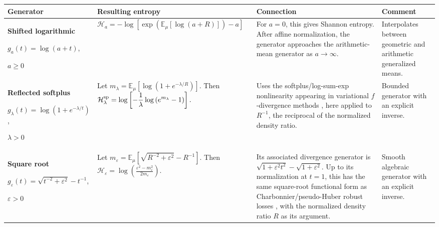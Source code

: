 \documentclass[reqno]{amsart}
\begin{document}
\begin{table}[t]
\centering
\small
\setlength{\tabcolsep}{4pt}
\renewcommand{\arraystretch}{1.35}
\begin{tabularx}{\textwidth}{
@{}
>{\raggedright\arraybackslash}p{}
>{\raggedright\arraybackslash}p{}
>{\raggedright\arraybackslash}X
>{\raggedright\arraybackslash}p{}
@{}
}
\toprule
Generator
&
Resulting entropy
&
Connection
&
Comment
\\
\midrule

\textbf{Shifted logarithmic}
\par
$g_a(t)=\log(a+t)$,
\par
$a\geq 0$
&
$\displaystyle
\mathcal H_a
=
-\log\left[
\exp\left(
\mathbb E_\mu[\log(a+R)]
\right)-a
\right]$
&
For $a=0$, this gives Shannon entropy. After affine normalization,
the generator approaches the arithmetic-mean generator as
$a\to\infty$.
&
Interpolates between geometric and arithmetic generalized means.
\\[3pt]

\textbf{Reflected softplus}
\par
$\displaystyle
g_\lambda(t)
=
\log\left(1+e^{-\lambda/t}\right)$,
\par
$\lambda>0$
&
Let
$\displaystyle
m_\lambda
=
\mathbb E_\mu
\left[
\log\left(1+e^{-\lambda/R}\right)
\right].
$
Then
$\displaystyle
\mathcal H^{\rm sp}_\lambda
=
\log\left[
-\frac{1}{\lambda}
\log\left(e^{m_\lambda}-1\right)
\right].
$
&
Uses the softplus/log-sum-exp nonlinearity appearing in variational $f$-divergence methods \cite{NowCseTom16}, here applied to $R^{-1}$, the reciprocal of the normalized density ratio.
&
Bounded generator with an explicit inverse.
\\[3pt]

\textbf{Square root}
\par
$\displaystyle
g_\varepsilon(t)
=
\sqrt{t^{-2}+\varepsilon^2}-t^{-1}$,
\par
$\varepsilon>0$
&
Let
$\displaystyle
m_\varepsilon
=
\mathbb E_\mu
\left[
\sqrt{R^{-2}+\varepsilon^2}-R^{-1}
\right].
$
Then
$\displaystyle
\mathcal H_\varepsilon
=
\log\left(
\frac{\varepsilon^2-m_\varepsilon^2}
{2m_\varepsilon}
\right).
$
&
Its associated divergence generator is $\sqrt{1+\varepsilon^2t^2}-\sqrt{1+\varepsilon^2}$. Up to its normalization at $t=1$, this has the same square-root functional form as Charbonnier/pseudo-Huber robust losses \cite{Barron19}, with the
normalized density ratio $R$ as its argument.
&
Smooth algebraic generator with an explicit inverse.
\\[3pt]


\end{tabularx}
\end{table}
\end{document}
